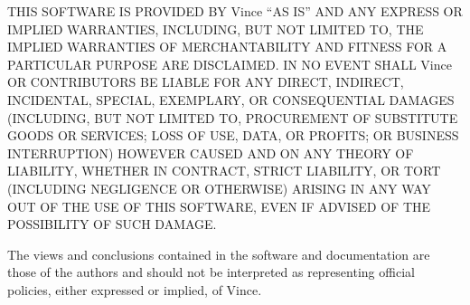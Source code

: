 THIS SOFTWARE IS PROVIDED BY Vince ``AS IS'' AND ANY EXPRESS OR IMPLIED WARRANTIES, INCLUDING, BUT NOT LIMITED TO, THE IMPLIED WARRANTIES OF MERCHANTABILITY AND FITNESS FOR A PARTICULAR PURPOSE ARE DISCLAIMED. IN NO EVENT SHALL Vince OR CONTRIBUTORS BE LIABLE FOR ANY DIRECT, INDIRECT, INCIDENTAL, SPECIAL, EXEMPLARY, OR CONSEQUENTIAL DAMAGES (INCLUDING, BUT NOT LIMITED TO, PROCUREMENT OF SUBSTITUTE GOODS OR SERVICES; LOSS OF USE, DATA, OR PROFITS; OR BUSINESS INTERRUPTION) HOWEVER CAUSED AND ON ANY THEORY OF LIABILITY, WHETHER IN CONTRACT, STRICT LIABILITY, OR TORT (INCLUDING NEGLIGENCE OR OTHERWISE) ARISING IN ANY WAY OUT OF THE USE OF THIS SOFTWARE, EVEN IF ADVISED OF THE POSSIBILITY OF SUCH DAMAGE.

The views and conclusions contained in the software and documentation are those of the authors and should not be interpreted as representing official policies, either expressed or implied, of Vince. 